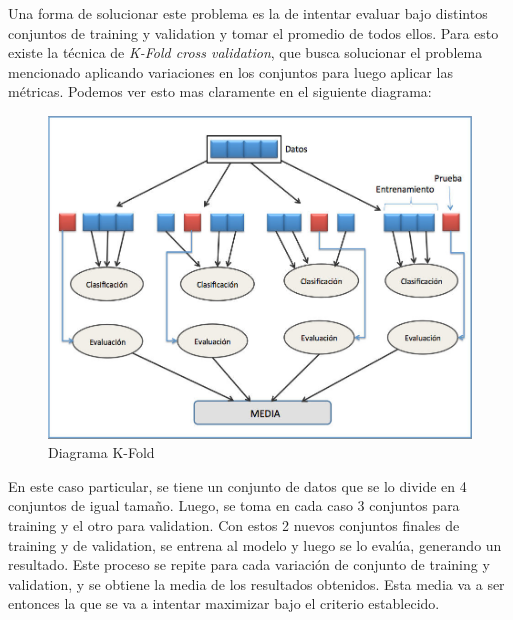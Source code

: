     Una forma de solucionar este problema es la de intentar evaluar bajo distintos conjuntos de training y validation y tomar el promedio de todos ellos. Para esto existe la técnica de \emph{K-Fold cross validation}, que busca solucionar el problema mencionado aplicando variaciones en los conjuntos para luego aplicar las métricas. Podemos ver esto mas claramente en el siguiente diagrama:
    
    \begin{figure}[H]
        \begin{center}
            \includegraphics[scale=0.3]{img/explicaciones/k_fold.png}
        \end{center}
        \caption{Diagrama K-Fold}
    \end{figure}
    
    En este caso particular, se tiene un conjunto de datos que se lo divide en 4 conjuntos de igual tamaño. Luego, se toma en cada caso 3 conjuntos para training y el otro para validation. Con estos 2 nuevos conjuntos finales de training y de validation, se entrena al modelo y luego se lo evalúa, generando un resultado. Este proceso se repite para cada variación de conjunto de training y validation, y se obtiene la media de los resultados obtenidos. Esta media va a ser entonces la que se va a intentar maximizar bajo el criterio establecido.